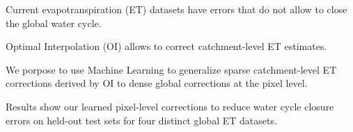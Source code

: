 \documentclass[draft]{agujournal2019}
\begin{document}



\begin{keypoints}
\item Current evapotranspiration (ET) datasets have errors that do not allow to close the global water cycle.
\item Optimal Interpolation (OI) allows to correct catchment-level ET estimates. 
\item We porpose to use Machine Learning to generalize sparse catchment-level ET corrections derived by OI to dense global corrections at the pixel level.
\item Results show our learned pixel-level corrections to reduce water cycle closure errors on held-out test sets for four distinct global ET datasets.
\end{keypoints}

%
%

%
%
\end{document}

